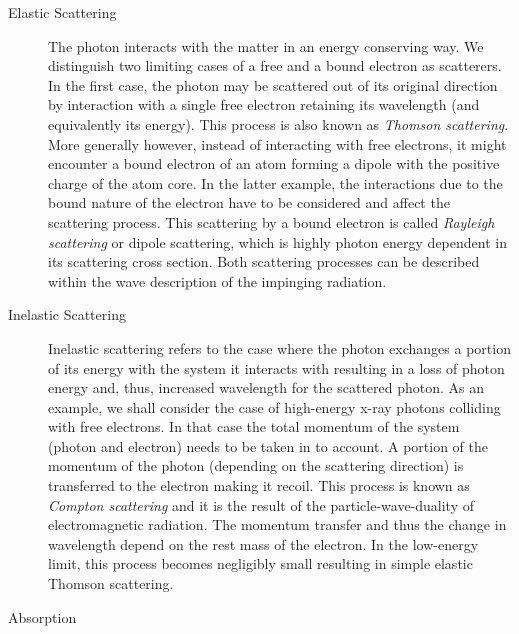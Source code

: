 \begin{description}
       \item[Elastic Scattering]
          {The photon interacts with the matter in an energy conserving way. We distinguish two limiting cases of a free and a bound electron as scatterers. In the first case, the photon may be scattered out of its original direction by interaction with a single free electron retaining its wavelength (and equivalently its energy). This process is also known as \emph{Thomson scattering}. More generally however, instead of interacting with free electrons, it might encounter a bound electron of an atom forming a dipole with the positive charge of the atom core. In the latter example, the interactions due to the bound nature of the electron have to be considered and affect the scattering process. This scattering by a bound electron is called \emph{Rayleigh scattering} or dipole scattering, which is highly photon energy dependent in its scattering cross section. Both scattering processes can be described within the wave description of the impinging radiation.}
       \item[Inelastic Scattering]
          {Inelastic scattering refers to the case where the photon exchanges a portion of its energy with the system it interacts with resulting in a loss of photon energy and, thus, increased wavelength for the scattered photon. As an example, we shall consider the case of high-energy x-ray photons colliding with free electrons. In that case the total momentum of the system (photon and electron) needs to be taken in to account. A portion of the momentum of the photon (depending on the scattering direction) is transferred to the electron making it recoil. This process is known as \emph{Compton scattering} and it is the result of the particle-wave-duality of electromagnetic radiation. The momentum transfer and thus the change in wavelength depend on the rest mass of the electron. In the low-energy limit, this process becomes negligibly small resulting in simple elastic Thomson scattering.}      %
       \item[Absorption]

\end{description}
